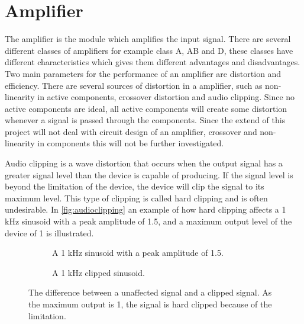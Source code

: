 \section{Amplifier}
The amplifier is the module which amplifies the input signal. There are several different classes of amplifiers for example class A, AB and D, these classes have different characteristics which gives them different advantages and disadvantages. Two main parameters for the performance of an amplifier are distortion and efficiency. There are several sources of distortion in a amplifier, such as non-linearity in active components, crossover distortion and audio clipping. Since no active components are ideal, all active components will create some distortion whenever a signal is passed through the components. Since the extend of this project will not deal with circuit design of an amplifier, crossover and non-linearity in components this will not be further investigated.

Audio clipping is a wave distortion that occurs when the output signal has a greater signal level than the device is capable of producing. If the signal level is beyond the limitation of the device, the device will clip the signal to its maximum level. This type of clipping is called hard clipping and is often undesirable. In \autoref{fig:audioclipping} an example of how hard clipping affects a 1 kHz sinusoid with a peak amplitude of 1.5, and a maximum output level of the device of 1 is illustrated.

\begin{figure}[H]
\centering
\begin{subfigure}[t]{0.47\textwidth}
	
	\caption{A 1 kHz sinusoid with a peak amplitude of 1.5.}
	\label{fig:clippingClean}
\end{subfigure}
\hspace{6mm} 
\begin{subfigure}[t]{0.47\textwidth}
	
	\caption{A 1 kHz clipped sinusoid.}
	\label{fig:clippingDist}
\end{subfigure}
\caption{The difference between a unaffected signal and a clipped signal. As the maximum output is 1, the signal is hard clipped because of the limitation.}
\label{fig:audioclipping}
\end{figure}

